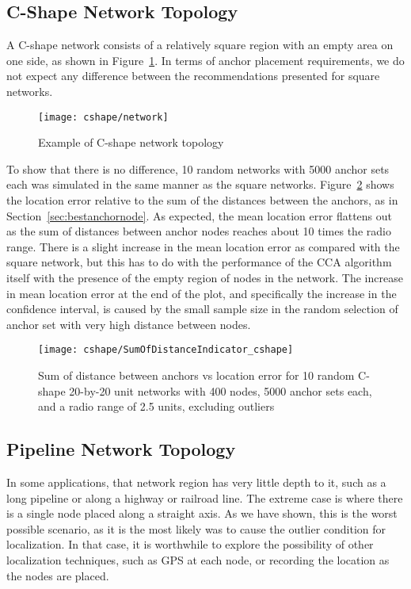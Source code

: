 \subsection{C-Shape Network Topology}

A C-shape network consists of a relatively square region with an empty area on one side, as shown in Figure~\ref{fig:cnetwork}.  In terms of anchor placement requirements, we do not expect any difference between the recommendations presented for square networks.

\begin{figure}
  \centering
	\texttt{[image: cshape/network]}
	\caption{Example of C-shape network topology}
	\label{fig:cnetwork}
\end{figure}

To show that there is no difference, 10 random networks with 5000 anchor sets each was simulated in the same manner as the square networks.  Figure~\ref{fig:cindicator} shows the location error relative to the sum of the distances between the anchors, as in Section~\ref{sec:bestanchornode}. 
As expected, the mean location error flattens out as the sum of distances between anchor nodes reaches about 10 times the radio range.  There is a slight increase in the mean location error as compared with the square network, but this has to do with the performance of the CCA algorithm itself with the presence of the empty region of nodes in the network.  The increase in mean location error at the end of the plot, and specifically the increase in the confidence interval, is caused by the small sample size in the random selection of anchor set with very high distance between nodes. 

\begin{figure}
  \centering
	\texttt{[image: cshape/SumOfDistanceIndicator\_cshape]}
	\caption[Sum of distance between anchors vs location error in a C-Shape topology]{Sum of distance between anchors vs location error for 10 random C-shape 20-by-20 unit networks with 400 nodes, 5000 anchor sets each, and a radio range of 2.5 units, excluding outliers}
	\label{fig:cindicator}
\end{figure}

\subsection{Pipeline Network Topology}

In some applications, that network region has very little depth to it, such as a long pipeline or along a highway or railroad line.  The extreme case is where there is a single node placed along a straight axis.  As we have shown, this is the worst possible scenario, as it is the most likely was to cause the outlier condition for localization.  In that case, it is worthwhile to explore the possibility of other localization techniques, such as GPS at each node, or recording the location as the nodes are placed.  

